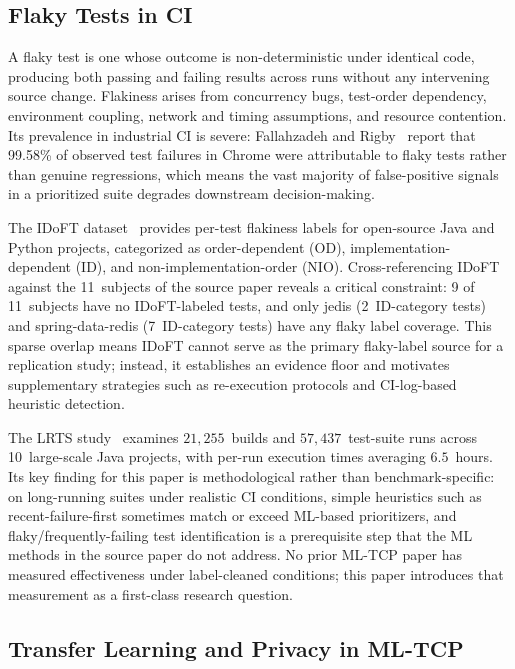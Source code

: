 \documentclass[10pt,conference]{IEEEtran}
\begin{document}
\subsection{Flaky Tests in CI}

A flaky test is one whose outcome is non-deterministic under identical code, producing both passing and failing results across runs without any intervening source change. Flakiness arises from concurrency bugs, test-order dependency, environment coupling, network and timing assumptions, and resource contention. Its prevalence in industrial CI is severe: Fallahzadeh and Rigby~\cite{chromeflakystudy} report that 99.58\% of observed test failures in Chrome were attributable to flaky tests rather than genuine regressions, which means the vast majority of false-positive signals in a prioritized suite degrades downstream decision-making.

The IDoFT dataset~\cite{idoft} provides per-test flakiness labels for open-source Java and Python projects, categorized as order-dependent (OD), implementation-dependent (ID), and non-implementation-order (NIO). Cross-referencing IDoFT against the 11~subjects of the source paper reveals a critical constraint: 9 of 11~subjects have no IDoFT-labeled tests, and only jedis (2~ID-category tests) and spring-data-redis (7~ID-category tests) have any flaky label coverage. This sparse overlap means IDoFT cannot serve as the primary flaky-label source for a replication study; instead, it establishes an evidence floor and motivates supplementary strategies such as re-execution protocols and CI-log-based heuristic detection.

The LRTS study~\cite{lrts} examines $21{,}255$~builds and $57{,}437$~test-suite runs across 10~large-scale Java projects, with per-run execution times averaging $6.5$~hours. Its key finding for this paper is methodological rather than benchmark-specific: on long-running suites under realistic CI conditions, simple heuristics such as recent-failure-first sometimes match or exceed ML-based prioritizers, and flaky/frequently-failing test identification is a prerequisite step that the ML methods in the source paper do not address. No prior ML-TCP paper has measured effectiveness under label-cleaned conditions; this paper introduces that measurement as a first-class research question.

\subsection{Transfer Learning and Privacy in ML-TCP}
\end{document}

